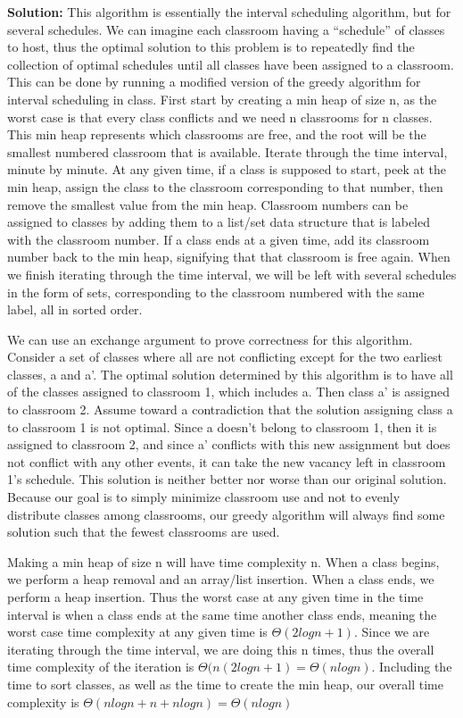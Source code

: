 \documentclass[10pt]{article}
\newcommand{\solution}[1]{\color{blue}\hfill\break\noindent\textbf{Solution:} #1\color{black}}
\begin{document}
\solution{
This algorithm is essentially the interval scheduling algorithm, but for several schedules. We can imagine each classroom having a “schedule” of classes to host, thus the optimal solution to this problem is to repeatedly find the collection of optimal schedules until all classes have been assigned to a classroom. This can be done by running a modified version of the greedy algorithm for interval scheduling in class. First start by creating a min heap of size n, as the worst case is that every class conflicts and we need n classrooms for n classes. This min heap represents which classrooms are free, and the root will be the smallest numbered classroom that is available. Iterate through the time interval, minute by minute. At any given time, if a class is supposed to start, peek at the min heap, assign the class to the classroom corresponding to that number, then remove the smallest value from the min heap. Classroom numbers can be assigned to classes by adding them to a list/set data structure that is labeled with the classroom number. If a class ends at a given time, add its classroom number back to the min heap, signifying that that classroom is free again. When we finish iterating through the time interval, we will be left with several schedules in the form of sets, corresponding to the classroom numbered with the same label, all in sorted order.

We can use an exchange argument to prove correctness for this algorithm. Consider a set of classes where all are not conflicting except for the two earliest classes, a and a’. The optimal solution determined by this algorithm is to have all of the classes assigned to classroom 1, which includes a. Then class a’ is assigned to classroom 2. Assume toward a contradiction that the solution assigning class a to classroom 1 is not optimal. Since a doesn’t belong to classroom 1, then it is assigned to classroom 2, and since a’ conflicts with this new assignment but does not conflict with any other events, it can take the new vacancy left in classroom 1’s schedule. This solution is neither better nor worse than our original solution. Because our goal is to simply minimize classroom use and not to evenly distribute classes among classrooms, our greedy algorithm will always find some solution such that the fewest classrooms are used.

Making a min heap of size n will have time complexity n. When a class begins, we perform a heap removal and an array/list insertion. When a class ends, we perform a heap insertion. Thus the worst case at any given time in the time interval is when a class ends at the same time another class ends, meaning the worst case time complexity at any given time is $\Theta(2logn + 1)$. Since we are iterating through the time interval, we are doing this n times, thus the overall time complexity of the iteration is $\Theta(n(2logn + 1) = \Theta(nlogn)$. Including the time to sort classes, as well as the time to create the min heap, our overall time complexity is $\Theta(nlogn + n + nlogn) = \Theta(nlogn)$
}
\end{document}
